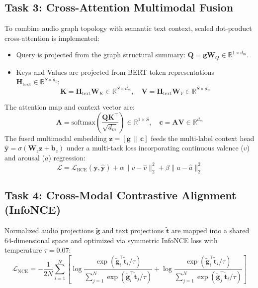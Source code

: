 \documentclass{article}
\begin{document}
\subsection{Task 3: Cross-Attention Multimodal Fusion}
To combine audio graph topology with semantic text context, scaled dot-product cross-attention is implemented:
\begin{itemize}
    \item Query is projected from the graph structural summary: $\mathbf{Q} = \mathbf{g} \mathbf{W}_Q \in \mathbb{R}^{1 \times d_m}$.
    \item Keys and Values are projected from BERT token representations $\mathbf{H}_{\text{text}} \in \mathbb{R}^{S \times d_t}$:
    \begin{equation}
        \mathbf{K} = \mathbf{H}_{\text{text}} \mathbf{W}_K \in \mathbb{R}^{S \times d_m}, \quad \mathbf{V} = \mathbf{H}_{\text{text}} \mathbf{W}_V \in \mathbb{R}^{S \times d_m}
    \end{equation}
\end{itemize}
The attention map and context vector are:
\begin{equation}
    \mathbf{A} = \text{softmax}\left( \frac{\mathbf{Q} \mathbf{K}^\top}{\sqrt{d_m}} \right) \in \mathbb{R}^{1 \times S}, \quad \mathbf{c} = \mathbf{A} \mathbf{V} \in \mathbb{R}^{d_m}
\end{equation}
The fused multimodal embedding $\mathbf{z} = [\mathbf{g} \,\|\, \mathbf{c}]$ feeds the multi-label context head $\hat{\mathbf{y}} = \sigma(\mathbf{W}_z \mathbf{z} + \mathbf{b}_z)$ under a multi-task loss incorporating continuous valence ($v$) and arousal ($a$) regression:
\begin{equation}
    \mathcal{L} = \mathcal{L}_{\text{BCE}}(\mathbf{y}, \hat{\mathbf{y}}) + \alpha \|v - \hat{v}\|_2^2 + \beta \|a - \hat{a}\|_2^2
\end{equation}

\subsection{Task 4: Cross-Modal Contrastive Alignment (InfoNCE)}
Normalized audio projections $\tilde{\mathbf{g}}$ and text projections $\tilde{\mathbf{t}}$ are mapped into a shared 64-dimensional space and optimized via symmetric InfoNCE loss with temperature $\tau = 0.07$:
\begin{equation}
    \mathcal{L}_{\text{NCE}} = -\frac{1}{2N}\sum_{i=1}^N \left[ \log \frac{\exp(\tilde{\mathbf{g}}_i^\top \tilde{\mathbf{t}}_i / \tau)}{\sum_{j=1}^N \exp(\tilde{\mathbf{g}}_i^\top \tilde{\mathbf{t}}_j / \tau)} + \log \frac{\exp(\tilde{\mathbf{g}}_i^\top \tilde{\mathbf{t}}_i / \tau)}{\sum_{j=1}^N \exp(\tilde{\mathbf{g}}_j^\top \tilde{\mathbf{t}}_i / \tau)} \right]
\end{equation}
\end{document}
